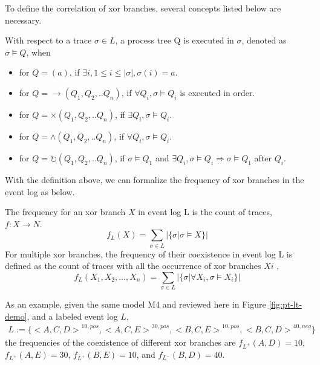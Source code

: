 To define the correlation of xor branches, several concepts listed below are necessary. 
\begin{definition}
	With respect to a trace $\sigma \in L$, a process tree Q is executed in $\sigma$, denoted as $\sigma \models Q$, when
		\begin{itemize}
		\item for $Q=(a)$, if $\exists i, 1 \leq i \leq |\sigma|, \sigma(i)=a$.
		\item for $Q= \rightarrow(Q_1 , Q_2 ,.. Q_n)$, if $\forall Q_i, \sigma \models Q_i$ is executed in order.
		\item for $Q= \times(Q_1 , Q_2 ,.. Q_n)$,  if $\exists Q_i, \sigma \models Q_i$.
		\item for $Q= \land (Q_1 , Q_2 ,.. Q_n)$, if $\forall Q_i, \sigma \models Q_i$.
		\item for $Q= \circlearrowright(Q_1 , Q_2 ,.. Q_n)$,  if $ \sigma \models Q_1$ and $\exists Q_i, \sigma \models Q_i \Rightarrow  \sigma \models Q_1$ after $Q_i$.
	\end{itemize} 
\end{definition}
With the definition above, we can formalize the frequency of xor branches in the event log as below.
\begin{definition}
	The frequency for an xor branch $X$ in event log L is the count of traces, $f: X \rightarrow N$.   
	\[f_{L}(X) = \sum_{\sigma \in L} |\{\sigma \vert \sigma \models X\} |\]
	For multiple xor branches, the frequency of their coexistence in event log L is defined as the count of traces with all the occurrence of xor branches ${Xi}$ , \[f_{L}(X_1, X_2,...,X_n)= \sum_{\sigma \in L} |\{\sigma \vert \forall X_i, \sigma \models X_i\} | \]
\end{definition}
As an example, given the same model M4 and reviewed here in Figure \ref{fig:pt-lt-demo}, and a labeled event log $L$,
\begin{align*}
L:= \{  {<A,C,D>}^{10, pos}, {<A,C,E>}^{30,pos}, {<B,C,E>}^{10,pos}, {<B,C,D>}^{40, neg}\}
\end{align*} the frequencies of the coexistence of different xor branches are
$f_{L^+}(A, D)=10$, $f_{L^+}(A, E)=30$, $f_{L^+}(B, E)=10$, and $f_{L^-}(B, D)=40$.

